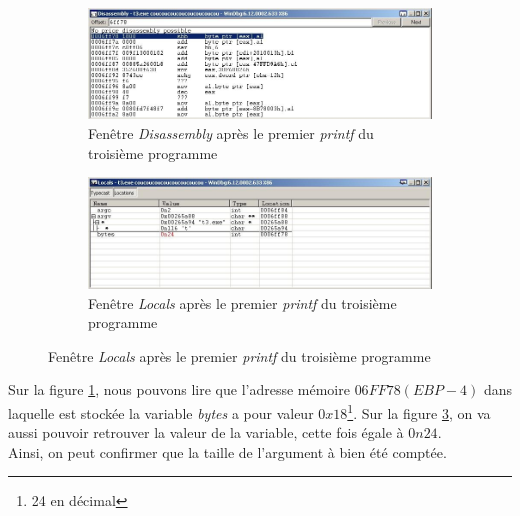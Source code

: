 \begin{figure}[H]
  \begin{minipage}{.45\textwidth}
    \begin{figure}[H]
      \centering
      \includegraphics[width=.9\textwidth]{img/207.JPG}
      \caption{Fenêtre \textit{Disassembly} après le premier \textit{printf} du troisième programme}
      \label{img:8}
    \end{figure}
  \end{minipage}
  \begin{minipage}{.45\textwidth}
    \begin{figure}[H]
      \centering
      \includegraphics[width=.9\textwidth]{img/208.JPG}
      \caption{Fenêtre \textit{Locals} après le premier \textit{printf} du troisième programme}
      \label{img:9}
    \end{figure}
  \end{minipage}
\end{figure}
Sur la figure \ref{img:8}, nous pouvons lire que l'adresse mémoire $06FF78 (EBP - 4)$ dans laquelle est stockée la variable \textit{bytes} a pour valeur $0x18$\footnote{24 en décimal}. Sur la figure \ref{img:9}, on va aussi pouvoir retrouver la valeur de la variable, cette fois égale à $0n24$.\\
Ainsi, on peut confirmer que la taille de l'argument à bien été comptée.